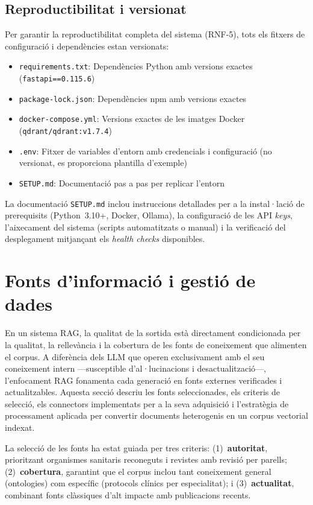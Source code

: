 \documentclass[CAT]{TFUOC}%
\begin{document}
\subsection{Reproductibilitat i versionat}

Per garantir la reproductibilitat completa del sistema (RNF-5), tots els fitxers de configuració i dependències estan versionats:

\begin{itemize}
    \item \texttt{requirements.txt}: Dependències Python amb versions exactes (\texttt{fastapi==0.115.6})
    \item \texttt{package-lock.json}: Dependències npm amb versions exactes
    \item \texttt{docker-compose.yml}: Versions exactes de les imatges Docker (\texttt{qdrant/qdrant:v1.7.4})
    \item \texttt{.env}: Fitxer de variables d'entorn amb credencials i configuració (no versionat, es proporciona plantilla d'exemple)
    \item \texttt{SETUP.md}: Documentació pas a pas per replicar l'entorn
\end{itemize}

La documentació \texttt{SETUP.md} inclou instruccions detallades per a la instal·lació de prerequisits (Python~3.10+, Docker, Ollama), la configuració de les API \textit{keys}, l'aixecament del sistema (scripts automatitzats o manual) i la verificació del desplegament mitjançant els \textit{health checks} disponibles.

\section{Fonts d'informació i gestió de dades}
\label{sec:fonts}

En un sistema RAG, la qualitat de la sortida està directament condicionada per la qualitat, la rellevància i la cobertura de les fonts de coneixement que alimenten el corpus. A diferència dels LLM que operen exclusivament amb el seu coneixement intern ---susceptible d'al·lucinacions i desactualització---, l'enfocament RAG fonamenta cada generació en fonts externes verificades i actualitzables. Aquesta secció descriu les fonts seleccionades, els criteris de selecció, els connectors implementats per a la seva adquisició i l'estratègia de processament aplicada per convertir documents heterogenis en un corpus vectorial indexat.

La selecció de les fonts ha estat guiada per tres criteris: (1)~\textbf{autoritat}, prioritzant organismes sanitaris reconeguts i revistes amb revisió per parells; (2)~\textbf{cobertura}, garantint que el corpus inclou tant coneixement general (ontologies) com específic (protocols clínics per especialitat); i (3)~\textbf{actualitat}, combinant fonts clàssiques d'alt impacte amb publicacions recents.
\end{document}
